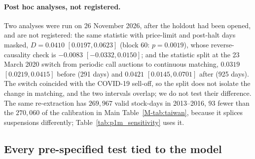 \documentclass[12pt]{article}
\theoremstyle{definition}
\theoremstyle{remark}
\begin{document}
\paragraph{Post hoc analyses, not registered.} Two analyses were run on 26 November 2026, after the holdout had been opened, and are not registered: the same statistic with price-limit and post-halt days masked, $D = 0.0410$ $[0.0197, 0.0623]$ (block 60: $p = 0.0019$), whose reverse-causality check is $-0.0083$ $[-0.0332, 0.0150]$; and the statistic split at the 23 March 2020 switch from periodic call auctions to continuous matching, $0.0319$ $[0.0219, 0.0415]$ before (291 days) and $0.0421$ $[0.0145, 0.0701]$ after (925 days). The switch coincided with the COVID-19 sell-off, so the split does not isolate the change in matching, and the two intervals overlap; we do not test their difference. The same re-extraction has $269{,}967$ valid stock-days in 2013--2016, $93$ fewer than the $270{,}060$ of the calibration in Main Table~\ref{M-tab:taiwan}, because it splices suspensions differently; Table~\ref{tab:p1m_sensitivity} uses it.

\subsection{Every pre-specified test tied to the model}
\end{document}
